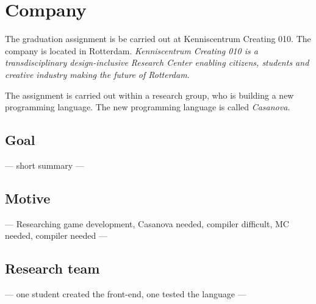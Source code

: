 \section{Company}
The graduation assignment is be carried out at Kenniscentrum Creating 010.
The company is located in Rotterdam.
\textit{Kenniscentrum Creating 010 is a transdisciplinary design-inclusive Research Center enabling citizens, students and creative industry making the future of Rotterdam}\cite{creating2016home}.

The assignment is carried out within a research group, who is building a new programming language.
The new programming language is called \emph{Casanova}.

\subsection{Goal}
--- short summary ---

\subsection{Motive}\label{motive}
--- Researching game development, Casanova needed, compiler difficult, MC needed, compiler needed ---

\subsection{Research team}
--- one student created the front-end, one tested the language ---

